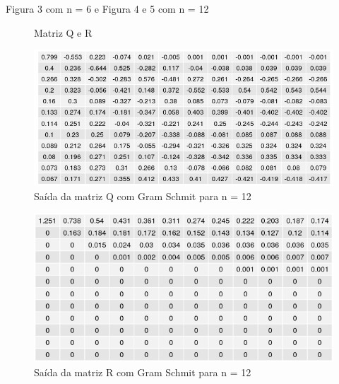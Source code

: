 \documentclass[12pt, a4paper]{article}
\begin{document}
Figura 3 com n = 6 e Figura 4 e 5 com n = 12
\begin{figure}[!htbp]
    \centering
    \qquad
    \caption{Matriz Q e R}
    \label{fig:example}
\end{figure}

\begin{figure}[!htbp]
    \centering
   \includegraphics[width= 14.5cm]{matrizes/matriz_hilbert_GR_Q12.png}
    \caption{Saída da matriz Q com Gram Schmit para n = 12}
    \label{fig:my_label}
\end{figure}

\begin{figure}[!htbp]
    \centering
    \includegraphics[width = 14.5cm]{matrizes/matriz_hilbert_GR_R12.png}
    \caption{Saída da matriz R com Gram Schmit para n = 12}
    \label{fig:my_label}
\end{figure}
\end{document}
